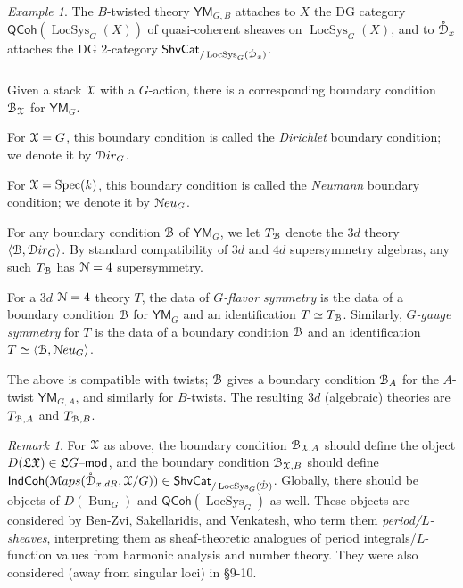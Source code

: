 \documentclass[reqno,11pt]{amsart}
\numberwithin{equation}{subsection}
\theoremstyle{remark}
\newtheorem{rem}[thm]{Remark}
\newtheorem{example}[thm]{Example}
\newcommand{\sB}{{\EuScript B}}
\newcommand{\sD}{{\EuScript D}}
\newcommand{\sM}{{\EuScript M}}
\newcommand{\sN}{{\EuScript N}}
\newcommand{\sX}{{\EuScript X}}
\newcommand{\fL}{{\mathfrak L}}
\newcommand{\fX}{{\mathfrak X}}
\newcommand{\on}{\operatorname}
\newcommand{\mathendash}{\text{\textendash}}
\newcommand{\Spec}{\on{Spec}}
\newcommand{\Bun}{\on{Bun}}
\newcommand{\LocSys}{\on{LocSys}}
\renewcommand{\mod}{\mathendash\mathsf{mod}}
\newcommand{\ShvCat}{\mathsf{ShvCat}}
\newcommand{\IndCoh}{\mathsf{IndCoh}}
\newcommand{\QCoh}{\mathsf{QCoh}}
\newcommand{\Maps}{\sM aps}
\renewcommand{\o}[1]{\mathring{#1}}
\newcommand{\YM}{\mathsf{YM}}
\newcommand{\Dir}{\sD ir}
\newcommand{\Neu}{\sN eu}
\newcommand{\pair}[2]{\langle #1,#2 \rangle}
\begin{document}
\begin{example}

The $B$-twisted theory $\YM_{G,B}$ attaches to $X$ the DG category 
$\QCoh(\LocSys_G(X))$ of quasi-coherent sheaves on 
$\LocSys_G(X)$, and to $\o{\sD}_x$ attaches
the DG 2-category $\ShvCat_{/\LocSys_{G}(\o{\sD}_x)}$.

\end{example}

\subsubsection{}\label{sss:bx-ym}

Given a stack $\sX$ with a $G$-action, there is a corresponding
boundary condition $\sB_{\sX}$ for $\YM_G$.

For $\sX = G$, this boundary condition is called the \emph{Dirichlet}
boundary condition; we denote it by $\Dir_G$.

For $\sX = \Spec(k)$, this boundary condition is called the \emph{Neumann}
boundary condition; we denote it by $\Neu_G$.

For any boundary condition $\sB$ of $\YM_G$, we let $T_{\sB}$ denote
the $3d$ theory $\pair{\sB}{\Dir_G}$. By standard compatibility of $3d$ and $4d$ 
supersymmetry algebras, any such $T_{\sB}$ has $\sN = 4$ supersymmetry.

For a $3d$ $\sN = 4$ theory $T$, the data of \emph{$G$-flavor symmetry} 
is the data of a boundary condition $\sB$ for $\YM_G$ and an identification
$T \simeq T_{\sB}$. Similarly, \emph{$G$-gauge symmetry} for $T$
is the data of a boundary condition $\sB$ and an identification
$T \simeq \pair{\sB}{\Neu_G}$.

The above is compatible with twists; $\sB$ gives a boundary condition 
$\sB_A$ for the $A$-twist $\YM_{G,A}$, and similarly for $B$-twists. 
The resulting $3d$ (algebraic) theories are $T_{\sB,A}$ and $T_{\sB,B}$.

\begin{rem}

For $\sX$ as above, the boundary condition $\sB_{\sX,A}$ should define
the object $D(\fL \fX) \in \fL G\mod$, and the boundary condition 
$\sB_{\sX,B}$ should define $\IndCoh(\Maps(\o{\sD}_{x,dR},\sX/G)) \in 
\ShvCat_{/\LocSys_G(\o{\sD})}$. Globally, there should be objects
of $D(\Bun_G)$ and $\QCoh(\LocSys_G)$ as well. These objects 
are considered by Ben-Zvi, Sakellaridis, and Venkatesh, who 
term them \emph{period/$L$-sheaves}, interpreting 
them as sheaf-theoretic analogues of period integrals/$L$-function values
from harmonic analysis and number theory. They were also considered
(away from singular loci) in \cite{gaiotto-s} \S 9-10. 

\end{rem}
\end{document}
